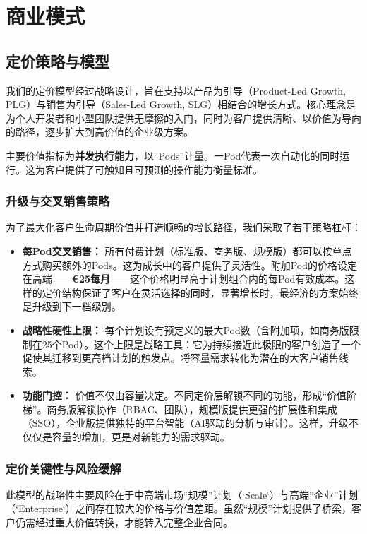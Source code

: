 \documentclass[11点, A4纸, 单面]{article}
\begin{document}
\section{商业模式}
\subsection{定价策略与模型}
我们的定价模型经过战略设计，旨在支持以产品为引导（Product-Led Growth, PLG）与销售为引导（Sales-Led Growth, SLG）相结合的增长方式。核心理念是为个人开发者和小型团队提供无摩擦的入门，同时为客户提供清晰、以价值为导向的路径，逐步扩大到高价值的企业级方案。

主要价值指标为\textbf{并发执行能力}，以“Pods”计量。一Pod代表一次自动化的同时运行。这为客户提供了可触知且可预测的操作能力衡量标准。

\subsubsection{升级与交叉销售策略}

为了最大化客户生命周期价值并打造顺畅的增长路径，我们采取了若干策略杠杆：

\begin{itemize}
    \item \textbf{每Pod交叉销售：} 所有付费计划（标准版、商务版、规模版）都可以按单点方式购买额外的Pods。这为成长中的客户提供了灵活性。附加Pod的价格设定在高端——\textbf{\euro{25}每月}——这个价格明显高于计划组合内的每Pod有效成本。这样的定价结构保证了客户在灵活选择的同时，显著增长时，最经济的方案始终是升级到下一档级别。

    \item \textbf{战略性硬性上限：} 每个计划设有预定义的最大Pod数（含附加项，如商务版限制在25个Pod）。这个上限是战略工具：它为持续接近此极限的客户创造了一个促使其迁移到更高档计划的触发点。将容量需求转化为潜在的大客户销售线索。

    \item \textbf{功能门控：} 价值不仅由容量决定。不同定价层解锁不同的功能，形成“价值阶梯”。商务版解锁协作（RBAC、团队），规模版提供更强的扩展性和集成（SSO），企业版提供独特的平台智能（AI驱动的分析与审计）。这样，升级不仅仅是容量的增加，更是对新能力的需求驱动。
\end{itemize}

\subsubsection{定价关键性与风险缓解}

此模型的战略性主要风险在于中高端市场“规模”计划（`Scale`）与高端“企业”计划（`Enterprise`）之间存在较大的价格与价值差距。虽然“规模”计划提供了桥梁，客户仍需经过重大价值转换，才能转入完整企业合同。
\end{document}
